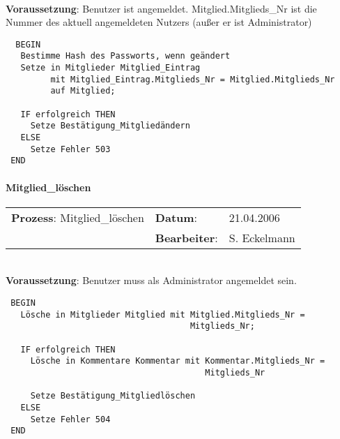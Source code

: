 \hrulefill\\
\textbf{Voraussetzung}: Benutzer ist angemeldet. Mitglied.Mitglieds\_Nr ist die Nummer des aktuell angemeldeten Nutzers (außer er ist Administrator)
\begin{verbatim}
  BEGIN
   Bestimme Hash des Passworts, wenn geändert
   Setze in Mitglieder Mitglied_Eintrag
         mit Mitglied_Eintrag.Mitglieds_Nr = Mitglied.Mitglieds_Nr
         auf Mitglied;
  
   IF erfolgreich THEN
     Setze Bestätigung_Mitgliedändern
   ELSE
     Setze Fehler 503
 END
\end{verbatim}
\hrulefill



\paragraph{Mitglied\_löschen}
\begin{tabular}[t]{p{9.5cm}ll}
\textbf{Prozess}: Mitglied\_löschen  	&\textbf{Datum}:      &21.04.2006\\
					&\textbf{Bearbeiter}: &S. Eckelmann\\
\end{tabular}

\hrulefill\\
\textbf{Voraussetzung}: Benutzer muss als Administrator angemeldet sein.
\begin{verbatim}
 BEGIN
   Lösche in Mitglieder Mitglied mit Mitglied.Mitglieds_Nr = 
                                     Mitglieds_Nr;

   IF erfolgreich THEN
     Lösche in Kommentare Kommentar mit Kommentar.Mitglieds_Nr = 
                                        Mitglieds_Nr

     Setze Bestätigung_Mitgliedlöschen
   ELSE
     Setze Fehler 504
 END
\end{verbatim}
\hrulefill